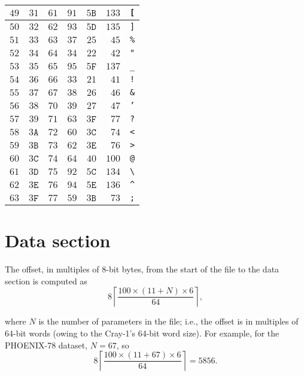 \documentclass{report}
\begin{document}
\begin{table}
\begin{tabular}{|rrr|rrrl|}
\( 49\) & \( 31\) & \( 61\) & \( 91\) & \( 5\mathtt{B}\) & \(133\) & \texttt{[} \\ \hline
\( 50\) & \( 32\) & \( 62\) & \( 93\) & \( 5\mathtt{D}\) & \(135\) & \texttt{]} \\ \hline
\( 51\) & \( 33\) & \( 63\) & \( 37\) & \( 25\) & \( 45\) & \texttt{\%} \\ \hline
\( 52\) & \( 34\) & \( 64\) & \( 34\) & \( 22\) & \( 42\) & \texttt{"} \\ \hline
\( 53\) & \( 35\) & \( 65\) & \( 95\) & \( 5\mathtt{F}\) & \(137\) & \texttt{\_} \\ \hline
\( 54\) & \( 36\) & \( 66\) & \( 33\) & \( 21\) & \( 41\) & \texttt{!} \\ \hline
\( 55\) & \( 37\) & \( 67\) & \( 38\) & \( 26\) & \( 46\) & \texttt{\&} \\ \hline
\( 56\) & \( 38\) & \( 70\) & \( 39\) & \( 27\) & \( 47\) & \texttt{'} \\ \hline
\( 57\) & \( 39\) & \( 71\) & \( 63\) & \( 3\mathtt{F}\) & \( 77\) & \texttt{?} \\ \hline
\( 58\) & \( 3\mathtt{A}\) & \( 72\) & \( 60\) & \( 3\mathtt{C}\) & \( 74\) & \texttt{<} \\ \hline
\( 59\) & \( 3\mathtt{B}\) & \( 73\) & \( 62\) & \( 3\mathtt{E}\) & \( 76\) & \texttt{>} \\ \hline
\( 60\) & \( 3\mathtt{C}\) & \( 74\) & \( 64\) & \( 40\) & \(100\) & \texttt{@} \\ \hline
\( 61\) & \( 3\mathtt{D}\) & \( 75\) & \( 92\) & \( 5\mathtt{C}\) & \(134\) & \texttt{\textbackslash} \\ \hline
\( 62\) & \( 3\mathtt{E}\) & \( 76\) & \( 94\) & \( 5\mathtt{E}\) & \(136\) & \texttt{\^} \\ \hline
\( 63\) & \( 3\mathtt{F}\) & \( 77\) & \( 59\) & \( 3\mathtt{B}\) & \( 73\) & \texttt{;} \\ \hline
\end{tabular}
\end{table}

\section{Data section}

The offset, in multiples of 8-bit bytes, from the start of the file to the data section is computed as
\[
	8 \left \lceil \dfrac{100\times(11+N)\times6}{64} \right \rceil \mathrm{,}
\]

\noindent where \(N\) is the number of parameters in the file; i.e., the offset is in multiples of 64-bit words (owing to the Cray-1's 64-bit word size). For example, for the PHOENIX-78 dataset, \(N = 67\), so
\[
	8 \left \lceil \dfrac{100\times(11+67)\times 6}{64} \right \rceil = 5856 \mathrm{.}
\]
\end{document}
